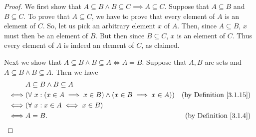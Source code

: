 \begin{proof}
    We first show that \(A \subseteq B \land B \subseteq C \implies A \subseteq C\).
    Suppose that \(A \subseteq B\) and \(B \subseteq C\).
    To prove that \(A \subseteq C\), we have to prove that every element of \(A\) is an element of \(C\).
    So, let us pick an arbitrary element \(x\) of \(A\).
    Then, since \(A \subseteq B\), \(x\) must then be an element of \(B\).
    But then since \(B \subseteq C\), \(x\) is an element of \(C\).
    Thus every element of \(A\) is indeed an element of \(C\), as claimed.

    Next we show that \(A \subseteq B \land B \subseteq A \iff A = B\).
    Suppose that \(A, B\) are sets and \(A \subseteq B \land B \subseteq A\).
    Then we have
    \begin{align*}
             & A \subseteq B \land B \subseteq A                                                                                \\
        \iff & (\forall\ x : (x \in A \implies x \in B) \land (x \in B \implies x \in A)) & \text{(by Definition \ref{3.1.15})} \\
        \iff & (\forall\ x : x \in A \iff x \in B)                                                                              \\
        \iff & A = B.                                                                     & \text{(by Definition \ref{3.1.4})}
    \end{align*}


\end{proof}
